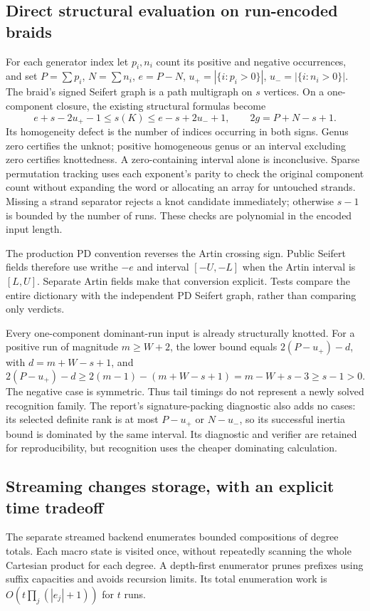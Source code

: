 \subsection{Direct structural evaluation on run-encoded braids}
For each generator index let $p_i,n_i$ count its positive and negative
occurrences, and set $P=\sum p_i$, $N=\sum n_i$, $e=P-N$,
$u_+=|\{i:p_i>0\}|$, $u_-=|\{i:n_i>0\}|$. The braid's signed Seifert
graph is a path multigraph on $s$ vertices. On a one-component closure,
the existing structural formulas become
\[
 e+s-2u_+-1\le s(K)\le e-s+2u_-+1,
 \qquad 2g=P+N-s+1.
\]
Its homogeneity defect is the number of indices occurring in both signs.
Genus zero certifies the unknot; positive homogeneous genus or an interval
excluding zero certifies knottedness. A zero-containing interval alone is
inconclusive. Sparse permutation tracking uses each exponent's parity to
check the original component count without expanding the word or allocating
an array for untouched strands. Missing a strand separator rejects a knot
candidate immediately; otherwise $s-1$ is bounded by the number of runs.
These checks are polynomial in the encoded input length.

The production PD convention reverses the Artin crossing sign. Public
Seifert fields therefore use writhe $-e$ and interval $[-U,-L]$ when the
Artin interval is $[L,U]$. Separate Artin fields make that conversion
explicit. Tests compare the entire dictionary with the independent PD
Seifert graph, rather than comparing only verdicts.

Every one-component dominant-run input is already structurally knotted.
For a positive run of magnitude $m\ge W+2$, the lower bound equals
$2(P-u_+)-d$, with $d=m+W-s+1$, and
\[
 2(P-u_+)-d\ge 2(m-1)-(m+W-s+1)
             =m-W+s-3\ge s-1>0.
\]
The negative case is symmetric. Thus tail timings do not represent a newly
solved recognition family. The report's signature-packing diagnostic also
adds no cases: its selected definite rank is at most $P-u_+$ or $N-u_-$,
so its successful inertia bound is dominated by the same interval. Its
diagnostic and verifier are retained for reproducibility, but recognition
uses the cheaper dominating calculation.

\subsection{Streaming changes storage, with an explicit time tradeoff}
The separate streamed backend enumerates bounded compositions of degree
totals. Each macro state is visited once, without repeatedly scanning the
whole Cartesian product for each degree. A depth-first enumerator prunes
prefixes using suffix capacities and avoids recursion limits. Its total
enumeration work is $O(t\prod_j(|e_j|+1))$ for $t$ runs.

